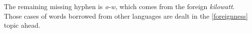 
The remaining missing hyphen is \emph{o-w}, which comes from the foreign \emph{kilowatt}.
Those cases of words borrowed from other languages are dealt in the \ref{foreignness} topic ahead.









